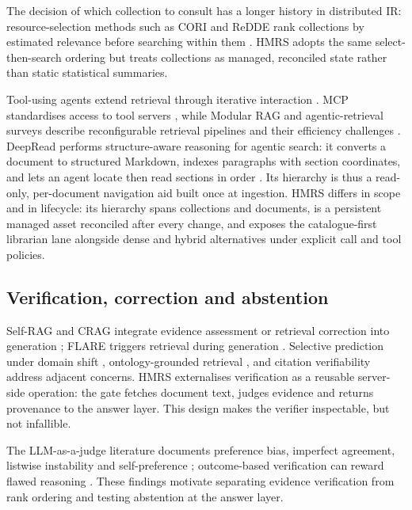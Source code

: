 The decision of which collection to consult has a longer history in
distributed IR: resource-selection methods such as CORI and ReDDE rank
collections by estimated relevance before searching within them
\citep{callan1995searching,si2003redde}. HMRS adopts the same
select-then-search ordering but treats collections as managed, reconciled
state rather than static statistical summaries.

Tool-using agents extend retrieval through iterative interaction
\citep{react-yao,toolformer}. MCP standardises access to tool servers
\citep{mcp}, while Modular RAG and agentic-retrieval surveys describe
reconfigurable retrieval pipelines and their efficiency challenges
\citep{modular-rag,singh-agentic-rag}. DeepRead performs structure-aware
reasoning for agentic search: it converts a document to structured Markdown,
indexes paragraphs with section coordinates, and lets an agent locate then
read sections in order \citep{deepread}. Its hierarchy is thus a read-only,
per-document navigation aid built once at ingestion. HMRS differs in scope
and in lifecycle: its hierarchy spans collections and documents, is a
persistent managed asset reconciled after every change, and exposes the
catalogue-first librarian lane alongside dense and hybrid alternatives under
explicit call and tool policies.

\subsection{Verification, correction and abstention}
Self-RAG and CRAG integrate evidence assessment or retrieval correction into
generation \citep{selfrag,crag}; FLARE triggers retrieval during generation
\citep{flare}. Selective prediction under domain shift \citep{kamath},
ontology-grounded retrieval \citep{cyberbot}, and citation verifiability
\citep{liu-verifiability,gao-citations} address adjacent concerns. HMRS externalises
verification as a reusable server-side operation: the gate fetches document
text, judges evidence and returns provenance to the answer layer. This design
makes the verifier inspectable, but not infallible.

The LLM-as-a-judge literature documents preference bias, imperfect agreement,
listwise instability and self-preference \citep{zheng-llmjudge,sun-urara,panickssery-selfpref}; outcome-based verification can reward flawed reasoning
\citep{lightman-verify}. These findings motivate separating evidence
verification from rank ordering and testing abstention at the answer layer.

